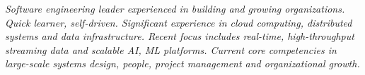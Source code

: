 {\selectfont
	\begin{justify}\textit{Software engineering leader experienced in building and growing organizations. Quick learner, self-driven. Significant experience in cloud computing, distributed systems and data infrastructure. Recent focus includes real-time, high-throughput streaming data and scalable AI, ML platforms. Current core competencies in large-scale systems design, people, project management and organizational growth.}\end{justify}
}